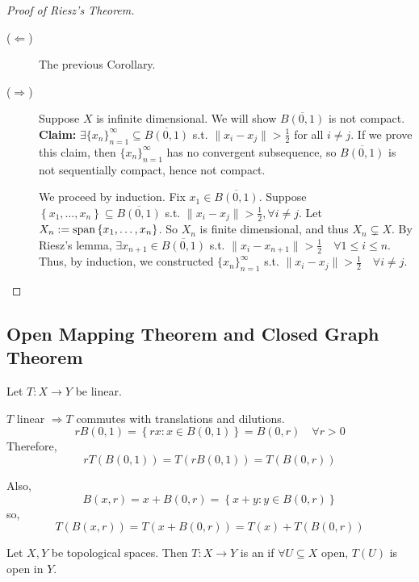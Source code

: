 \begin{proof} [Proof of Riesz's Theorem] \leavevmode
    \begin{description}
        \item[($\Leftarrow$)] The previous Corollary.
        \item[($\Rightarrow$)]  Suppose $X$ is infinite dimensional. We will show $\overline{B(0, 1)}$ is not compact.
    \newline\noindent \textbf{Claim:} $\exists \{ x_n \}_{n=1}^{\infty} \subseteq \overline{B(0, 1)}$ s.t. 
    $\| x_i - x_j \| > \frac{1}{2}$ for all $i \neq j$.
    \newline\noindent If we prove this claim, then $\{ x_n \}_{n=1}^{\infty} $ 
    has no convergent subsequence, so $\overline{B(0, 1)}$ is not sequentially compact, hence not compact.
    
    We proceed by induction. Fix $x_1 \in \overline{B(0, 1)}$. Suppose 
    $\left\{ x_1, \dots, x_n \right\} \subseteq \overline{B(0, 1)}$ s.t. $\| x_i - x_j \|  > \frac{1}{2}
    , \forall i \neq j$. Let $X_n := \operatorname{span} \left\{ x_1, \dots, x_n \right\} $. So $X_n$ is finite
    dimensional, and thus $X_n \subsetneq X$. By Riesz's lemma, $\exists x_{n + 1} \in \overline{B(0, 1)}$
    s.t. $\| x_i - x_{n + 1} \| > \frac{1}{2} \quad \forall 1 \leq i \leq n$. 
    Thus, by induction, we constructed $\{x_{n}\}_{n=1}^{\infty} $ s.t. $\| x_i - x_j \| > 
    \frac{1}{2} \quad \forall i \neq j $. \qedhere     
    \end{description} 
\end{proof}


\subsection{Open Mapping Theorem and Closed Graph Theorem}

Let $T : X \to Y$ be linear.

\begin{rem}
    $T$ linear $\Rightarrow T $ commutes with translations and dilutions.
    \[
        rB(0, 1) = \left\{ rx : x \in B(0, 1) \right\} = B(0, r) \quad \forall r > 0 
    \]   
    Therefore,
    \[
        rT(B(0, 1)) = T(rB(0, 1)) = T(B(0, r))
    \] 

    Also, 
    \[
        B(x, r) = x + B(0, r) = \left\{ x + y : y \in B(0, r) \right\}
    \] 
    so,
    \[
        T(B(x, r)) = T(x + B(0, r)) = T(x) + T(B(0, r))
    \] 
\end{rem}

\begin{defn}
    Let $X, Y$ be topological spaces. Then $T : X \to Y$ is an  
    if $\forall U \subseteq X$ open, $T(U)$ is open in $Y$.   
\end{defn}


